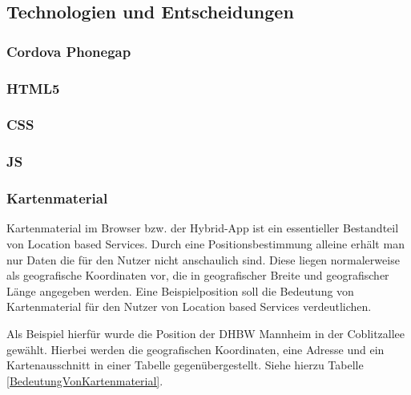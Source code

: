 \subsection{Technologien und Entscheidungen}

\subsubsection{Cordova Phonegap}

\subsubsection{HTML5}

\subsubsection{CSS}

\subsubsection{JS}

\subsubsection{Kartenmaterial}

Kartenmaterial im Browser bzw. der Hybrid-App ist ein essentieller Bestandteil von Location based Services. Durch eine Positionsbestimmung alleine erhält man nur Daten die für den Nutzer nicht anschaulich sind. Diese liegen normalerweise als geografische Koordinaten vor, die in geografischer Breite und geografischer Länge angegeben werden. Eine Beispielposition soll die Bedeutung von Kartenmaterial für den Nutzer von Location based Services verdeutlichen.

Als Beispiel hierfür wurde die Position der DHBW Mannheim in der Coblitzallee gewählt. Hierbei werden die geografischen Koordinaten, eine Adresse und ein Kartenausschnitt in einer Tabelle gegenübergestellt. Siehe hierzu Tabelle \ref{BedeutungVonKartenmaterial}.

